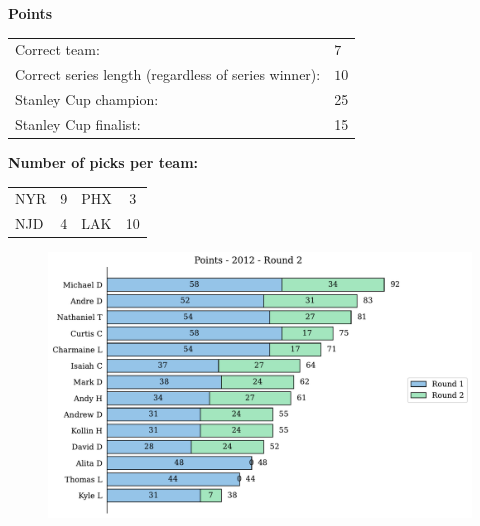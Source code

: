\documentclass[10pt]{article}
\begin{document}
{\bf Points}\\
\begin{minipage}{12cm}
    \begin{tabular}{l l}
        Correct team:	& $7$\\
        Correct series length (regardless of series winner):	& $10$\\
        Stanley Cup champion:	& 25\\
        Stanley Cup finalist:	& 15\\
    \end{tabular}

    \vspace{1cm}
    {\bf Number of picks per team:}\\
    \begin{tabular}{lc | lc }
        NYR & 9 & PHX & 3 \\
        NJD & 4 & LAK & 10 \\
    \end{tabular}
\end{minipage}
\begin{minipage}[t]{13cm}
    \begin{figure}[H]
        \vspace{-2.5cm}
        \includegraphics[width=13cm]{../../figures/2012/Points-2012-Round2.pdf}
    \end{figure}
\end{minipage}
\end{document}
